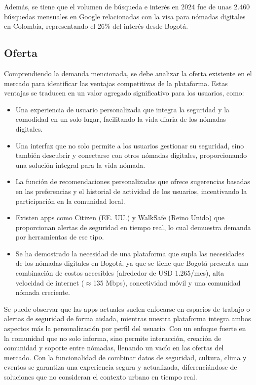 Además, se tiene que el volumen de búsqueda e interés en 2024 fue de unas 2.460 búsquedas mensuales en Google relacionadas con la visa para nómadas digitales en Colombia, representando el 26\% del interés desde Bogotá.\cite{volumen_nomadas_digitales}

\subsection*{Oferta}
Comprendiendo la demanda mencionada, se debe analizar la oferta existente en el mercado para identificar las ventajas competitivas de la plataforma. Estas ventajas se traducen en un valor agregado significativo para los usuarios, como:
\begin{itemize}
    \item Una experiencia de usuario personalizada que integra la seguridad y la comodidad en un solo lugar, facilitando la vida diaria de los nómadas digitales.
    \item Una interfaz que no solo permite a los usuarios gestionar su seguridad, sino también descubrir y conectarse con otros nómadas digitales, proporcionando una solución integral para la vida nómada.
    \item La función de recomendaciones personalizadas que ofrece sugerencias basadas en las preferencias y el historial de actividad de los usuarios, incentivando la participación en la comunidad local.
    \item Existen apps como Citizen (EE. UU.) y WalkSafe (Reino Unido) que proporcionan alertas de seguridad en tiempo real, lo cual demuestra demanda por herramientas de ese tipo.
    \item Se ha demostrado la necesidad de una plataforma que supla las necesidades de los nómadas digitales en Bogotá, ya que se tiene que Bogotá presenta una combinación de costos accesibles (alrededor de USD 1.265/mes), alta velocidad de internet ($\approx$135 Mbps), conectividad móvil y una comunidad nómada creciente.\cite{entorno_nomadas_digitales}
\end{itemize}

Se puede observar que las apps actuales suelen enfocarse en espacios de trabajo o alertas de seguridad de forma aislada, mientras nuestra plataforma integra ambos aspectos más la personalización por perfil del usuario. Con un enfoque fuerte en la comunidad que no solo informa, sino permite interacción, creación de comunidad y soporte entre nómadas, llenando un vacío en las ofertas del mercado.
Con la funcionalidad de combinar datos de seguridad, cultura, clima y eventos se garantiza una experiencia segura y actualizada, diferenciándose de soluciones que no consideran el contexto urbano en tiempo real.

